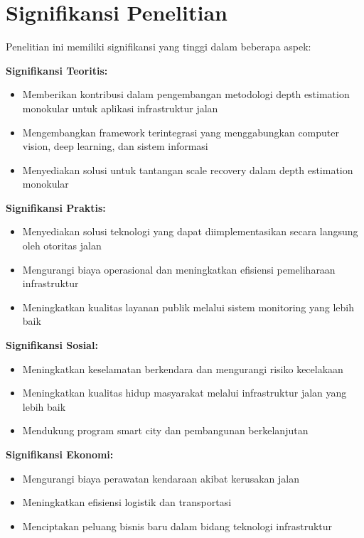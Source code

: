 \documentclass[12pt,a4paper]{report}
\begin{document}
\section{Signifikansi Penelitian}

Penelitian ini memiliki signifikansi yang tinggi dalam beberapa aspek:

\textbf{Signifikansi Teoritis:}
\begin{itemize}
    \item Memberikan kontribusi dalam pengembangan metodologi depth estimation monokular untuk aplikasi infrastruktur jalan
    \item Mengembangkan framework terintegrasi yang menggabungkan computer vision, deep learning, dan sistem informasi
    \item Menyediakan solusi untuk tantangan scale recovery dalam depth estimation monokular
\end{itemize}

\textbf{Signifikansi Praktis:}
\begin{itemize}
    \item Menyediakan solusi teknologi yang dapat diimplementasikan secara langsung oleh otoritas jalan
    \item Mengurangi biaya operasional dan meningkatkan efisiensi pemeliharaan infrastruktur
    \item Meningkatkan kualitas layanan publik melalui sistem monitoring yang lebih baik
\end{itemize}

\textbf{Signifikansi Sosial:}
\begin{itemize}
    \item Meningkatkan keselamatan berkendara dan mengurangi risiko kecelakaan
    \item Meningkatkan kualitas hidup masyarakat melalui infrastruktur jalan yang lebih baik
    \item Mendukung program smart city dan pembangunan berkelanjutan
\end{itemize}

\textbf{Signifikansi Ekonomi:}
\begin{itemize}
    \item Mengurangi biaya perawatan kendaraan akibat kerusakan jalan
    \item Meningkatkan efisiensi logistik dan transportasi
    \item Menciptakan peluang bisnis baru dalam bidang teknologi infrastruktur
\end{itemize}
\end{document}
